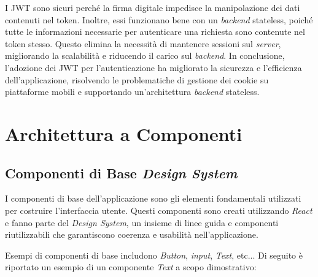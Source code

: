 I JWT sono sicuri perché la firma digitale impedisce la manipolazione dei dati contenuti nel token.
Inoltre, essi funzionano bene con un \textit{backend} stateless, poiché tutte le informazioni necessarie per autenticare una richiesta sono contenute nel token stesso.
Questo elimina la necessità di mantenere sessioni sul \textit{server}, migliorando la scalabilità e riducendo il carico sul \textit{backend}.
In conclusione, l'adozione dei JWT per l'autenticazione ha migliorato la sicurezza e l'efficienza dell'applicazione, risolvendo le problematiche di gestione dei cookie su piattaforme mobili e supportando un'architettura \textit{backend} stateless.

\section{Architettura a Componenti}
\label{sec:architettura_componenti}

\subsection{Componenti di Base \textit{Design System}}
I componenti di base dell'applicazione sono gli elementi fondamentali utilizzati per costruire l'interfaccia utente.
Questi componenti sono creati utilizzando \textit{React} e fanno parte del \textit{Design System}, un insieme di linee guida e componenti riutilizzabili che garantiscono coerenza e usabilità nell'applicazione.

Esempi di componenti di base includono \textit{Button}, \textit{input}, \textit{Text}, etc... 
Di seguito è riportato un esempio di un componente \textit{Text} a scopo dimostrativo:


